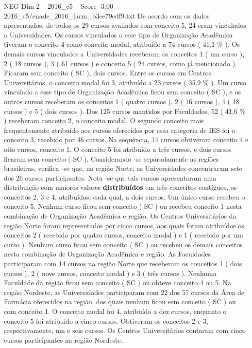 \begin{textsample}{NEG Dim 2 – 2016\_c5 – Score -3.00 – 2016\_c5/enade\_2016\_farm\_b3ee79edf9.txt}
De acordo com os dados apresentados, de todos os 29 cursos avaliados com conceito 5, 24 eram vinculados a Universidades.
Os cursos vinculados a esse tipo de Organização Acadêmica tiveram o conceito 4 como conceito modal, atribuído a 74 cursos ( 41,1 \% ).
Os demais cursos vinculados a Universidades receberam os conceitos 1 ( um curso ), 2 ( 18 cursos ), 3 ( 61 cursos ) e conceito 5 ( 24 cursos, como já mencionado ).
Ficaram sem conceito ( SC ), dois cursos.
Entre os cursos em Centros Universitários, o conceito modal foi 3, atribuído a 23 cursos ( 35,9 \% ).
Um curso vinculado a esse tipo de Organização Acadêmica ficou sem conceito ( SC ), e os outros cursos receberam os conceitos 1 ( quatro cursos ), 2 ( 16 cursos ), 4 ( 18 cursos ) e 5 ( dois cursos ).
Dos 125 cursos mantidos por Faculdades, 52 ( 41,6 \% ) receberam conceito 2, o conceito modal.
O segundo conceito mais frequentemente atribuído aos cursos oferecidos por essa categoria de IES foi o conceito 3, recebido por 46 cursos.
Na sequência, 14 cursos obtiveram conceito 4 e oito cursos, conceito 1.
O conceito 5 foi atribuído a três cursos, e dois cursos ficaram sem conceito ( SC ).
Considerando -se separadamente as regiões brasileiras, verifica -se que, na região Norte, as Universidades concentraram sete dos 26 cursos participantes.
Nota -se que tais cursos apresentaram uma distribuição com maiores valores \textbf{distribuídos} em três conceitos contíguos, os conceitos 2, 3 e 4, atribuídos, cada qual, a dois cursos.
Um único curso recebeu o conceito 5.
Nenhum curso ficou sem conceito ( SC ) ou recebeu conceito 1 nesta combinação de Organização Acadêmica e região.
Os Centros Universitários da região Norte foram representados por cinco cursos, aos quais foram atribuídos os conceitos 2 ( recebido por quatro cursos, conceito modal ) e 1 ( recebido por um curso ).
Nenhum curso ficou sem conceito ( SC ) ou recebeu os demais conceitos nesta combinação de Organização Acadêmica e região.
As Faculdades participaram com 14 cursos na região Norte que receberam os conceitos 1 ( dois cursos ), 2 ( nove cursos, conceito modal ) e 3 ( três cursos ).
Nenhuma Faculdade da região ficou sem conceito ( SC ) ou obteve conceito 4 ou 5.
Na região Nordeste, as Universidades participaram com 22 dos 57 cursos da Área de Farmácia oferecidos na região, dos quais nenhum ficou sem conceito ( SC ) ou com conceito 1.
O conceito modal foi 4, atribuído a dez cursos, enquanto o conceito 5 foi atribuído a cinco cursos.
Obtiveram os conceitos 2 e 3, respectivamente, um e seis cursos.
Os Centros Universitários contaram com cinco cursos participantes na região Nordeste.

\end{textsample}
